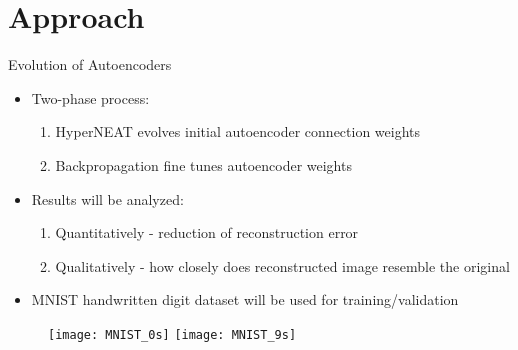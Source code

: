 \documentclass[xcolor=dvipsnames]{beamer}
\begin{document}
	\section{Approach}
	\begin{frame}{Evolution of Autoencoders}
		\begin{itemize}
			\item Two-phase process:
			\begin{enumerate}
				\item HyperNEAT evolves initial autoencoder connection weights
				\item Backpropagation fine tunes autoencoder weights
			\end{enumerate}
			
			\item Results will be analyzed:
			\begin{enumerate}
				\item Quantitatively - reduction of reconstruction error
				\item Qualitatively - how closely does reconstructed image resemble the original
			\end{enumerate}

			\item MNIST handwritten digit dataset will be used for training/validation			
		\end{itemize}
		\begin{figure}[h]
			\centering
			\texttt{[image: MNIST\_0s]}
			\texttt{[image: MNIST\_9s]}
		\end{figure}
	\end{frame}
	
\end{document}
